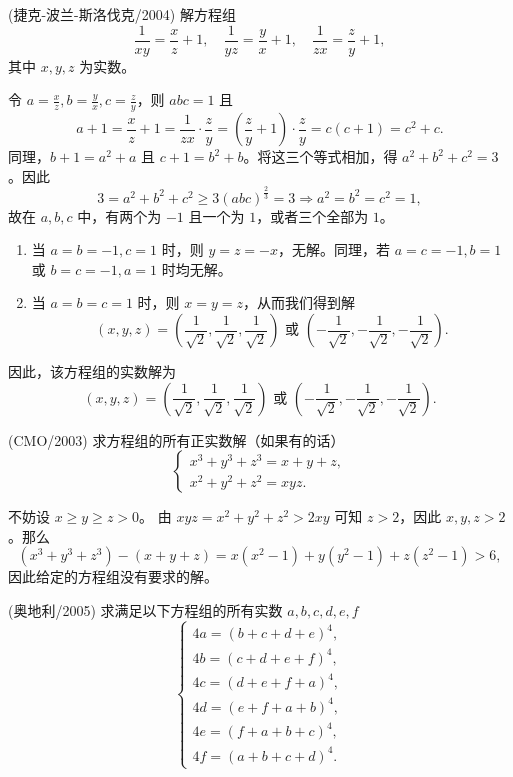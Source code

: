 \begin{questions}
\question (捷克-波兰-斯洛伐克/2004) 解方程组
\[
\frac{1}{xy} = \frac{x}{z} + 1, \quad \frac{1}{yz} = \frac{y}{x} + 1, \quad \frac{1}{zx} = \frac{z}{y} + 1,
\]
其中 $x, y, z$ 为实数。

\begin{solution}
令 $a = \frac{x}{z}, b = \frac{y}{x}, c = \frac{z}{y}$，则 $abc = 1$ 且
\[
a + 1 = \frac{x}{z} + 1 = \frac{1}{zx} \cdot \frac{z}{y} = \left( \frac{z}{y} + 1 \right) \cdot \frac{z}{y} = c(c + 1) = c^2 + c.
\]
同理，$b + 1 = a^2 + a$ 且 $c + 1 = b^2 + b$。将这三个等式相加，得 $a^2 + b^2 + c^2 = 3$。因此
\[
3 = a^2 + b^2 + c^2 \ge 3(abc)^{\frac{2}{3}} = 3 \Rightarrow a^2 = b^2 = c^2 = 1,
\]
故在 $a, b, c$ 中，有两个为 $-1$ 且一个为 $1$，或者三个全部为 $1$。
\begin{enumerate}
    \item[(i)] 当 $a = b = -1, c = 1$ 时，则 $y = z = -x$，无解。同理，若 $a = c = -1, b = 1$ 或 $b = c = -1, a = 1$ 时均无解。
    \item[(ii)] 当 $a = b = c = 1$ 时，则 $x = y = z$，从而我们得到解
    \[
    (x, y, z) = \left( \frac{1}{\sqrt{2}}, \frac{1}{\sqrt{2}}, \frac{1}{\sqrt{2}} \right) \text{ 或 } \left( -\frac{1}{\sqrt{2}}, -\frac{1}{\sqrt{2}}, -\frac{1}{\sqrt{2}} \right).
    \]
\end{enumerate}
因此，该方程组的实数解为
\[
(x, y, z) = \left( \frac{1}{\sqrt{2}}, \frac{1}{\sqrt{2}}, \frac{1}{\sqrt{2}} \right) \text{ 或 } \left( -\frac{1}{\sqrt{2}}, -\frac{1}{\sqrt{2}}, -\frac{1}{\sqrt{2}} \right).
\]
\end{solution}

\question (CMO/2003) 求方程组的所有正实数解（如果有的话）
\[
\begin{cases} x^3 + y^3 + z^3 = x + y + z, \\ x^2 + y^2 + z^2 = xyz. \end{cases}
\]

\begin{solution}
不妨设 $x \ge y \ge z > 0$。
由 $xyz = x^2 + y^2 + z^2 > 2xy$ 可知 $z > 2$，因此 $x, y, z > 2$。那么
\[
(x^3 + y^3 + z^3) - (x + y + z) = x(x^2 - 1) + y(y^2 - 1) + z(z^2 - 1) > 6,
\]
因此给定的方程组没有要求的解。
\end{solution}

\question (奥地利/2005) 求满足以下方程组的所有实数 $a, b, c, d, e, f$
\[
\begin{cases} 4a = (b + c + d + e)^4, \\ 4b = (c + d + e + f)^4, \\ 4c = (d + e + f + a)^4, \\ 4d = (e + f + a + b)^4, \\ 4e = (f + a + b + c)^4, \\ 4f = (a + b + c + d)^4. \end{cases}
\]


\end{questions}
